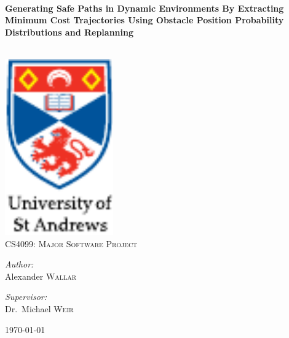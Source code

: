 
\begin{titlepage}

\begin{center}

\HRule \\[0.4cm]
{ \huge \bfseries Generating Safe Paths in Dynamic Environments By Extracting
Minimum Cost Trajectories Using Obstacle Position Probability Distributions and
Replanning\\[0.4cm] }

\HRule \\[3cm]


\includegraphics[width=0.35\textwidth]{figs/st-andrews-logo}~\\[1cm]

\textsc{\Large CS4099: Major Software Project}\\[1cm]

\noindent

\begin{minipage}{0.3\textwidth}

\begin{center} \large

\emph{Author:}\\

Alexander \textsc{Wallar}

\end{center}

\end{minipage}%
\begin{minipage}{0.3\textwidth}

\begin{center} \large

\emph{Supervisor:} \\

Dr.~Michael \textsc{Weir}

\end{center}

\end{minipage}%

\vfill

{\large \today}

\end{center}

\end{titlepage}
